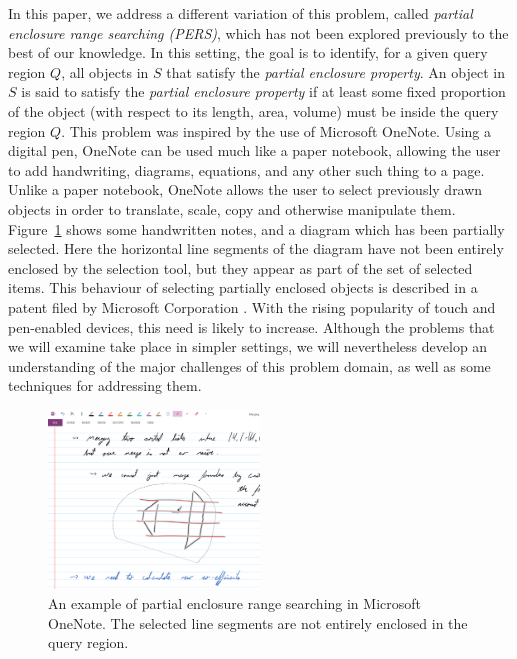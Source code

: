 \documentclass[a4paper,11pt]{article}
\newcommand{\PERS}[0]{PERS}
\begin{document}
In this paper, we address a different variation of this problem, 
called \emph{partial enclosure range searching (\PERS{})}, which 
has not been explored previously to the best of our knowledge. In 
this setting, the goal is to identify, for a given query region 
$Q$, all objects in $S$ that satisfy the \emph{partial enclosure 
property}. An object in $S$ is said to satisfy the \emph{partial 
enclosure property} if at least some fixed proportion of the object
(with respect to its length, area, volume) must be inside the query 
region $Q$. This problem was inspired by the use of Microsoft 
OneNote. Using a digital pen, OneNote can be used much like a paper 
notebook, allowing the user to add handwriting, diagrams, equations, 
and any other such thing to a page. Unlike a paper notebook, OneNote 
allows the user to select previously drawn objects in order to 
translate, scale, copy and otherwise manipulate them.
Figure~\ref{fig:intro:onenote} shows some handwritten notes, and a 
diagram which has been partially selected. Here the horizontal 
line segments of the diagram have not been entirely enclosed by 
the selection tool, but they appear as part of the set of selected 
items. This behaviour of selecting partially enclosed objects is 
described in a patent filed by Microsoft Corporation \cite{lassoselect}. 
With the rising popularity of touch and pen-enabled devices, this 
need is likely to increase. Although the problems that we will 
examine take place in simpler settings, we will nevertheless develop 
an understanding of the major challenges of this problem domain, as 
well as some techniques for addressing them.


\begin{figure}[t]
\begin{center}
  \includegraphics[width=0.50\textwidth]{figures/fig_onenote}
  \caption{An example of partial enclosure range searching in 
  Microsoft OneNote. The selected line segments are not entirely 
  enclosed in the query region.}
  \label{fig:intro:onenote}
\end{center}
\end{figure}
\end{document}
